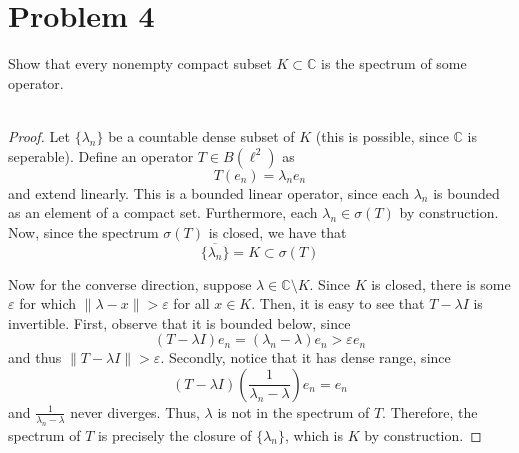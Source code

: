 \documentclass[fontsize=11pt]{scrartcl} %
\numberwithin{equation}{section} %
\numberwithin{figure}{section} %
\numberwithin{table}{section} %
\newcommand{\C}{\mathbb{C}}
\begin{document}
\section*{Problem 4}
Show that every nonempty compact subset $K\subset\C$ is the spectrum of some
operator.
\\
\\
\begin{proof}
    Let $\{\lambda_n\}$ be a countable dense subset of $K$ (this is possible,
    since $\C$ is seperable). Define an operator
    $T\in B(\ell^2)$ as
    \[
        T(e_n) = \lambda_ne_n
    \]
    and extend linearly. This is a bounded linear operator, since each
    $\lambda_n$ is bounded as an element of a compact set. Furthermore, each
    $\lambda_n\in\sigma(T)$ by construction. Now, since the spectrum $\sigma(T)$
    is closed, we have that
    \[
        \overline{\{\lambda_n\}} = K \subset \sigma(T)
    \]

    Now for the converse direction, suppose $\lambda\in \C\setminus K$. Since
    $K$ is closed, there is some $\varepsilon$ for which $\|\lambda - x\| >
    \varepsilon$ for all $x\in K$. Then, it is easy to see that $T-\lambda I$ is
    invertible. First, observe that it is bounded below, since
    \[
        (T-\lambda I)e_n = (\lambda_n-\lambda)e_n > \varepsilon e_n
    \]
    and thus $\|T-\lambda I\| > \varepsilon$. Secondly, notice that it has dense
    range, since
    \[
        (T-\lambda I)(\frac{1}{\lambda_n-\lambda})e_n = e_n
    \]
    and $\frac{1}{\lambda_n - \lambda}$ never diverges. Thus, $\lambda$ is not
    in the spectrum of $T$. Therefore, the spectrum of $T$ is precisely the
    closure of $\{\lambda_n\}$, which is $K$ by construction.
\end{proof}

\newpage
\end{document}
